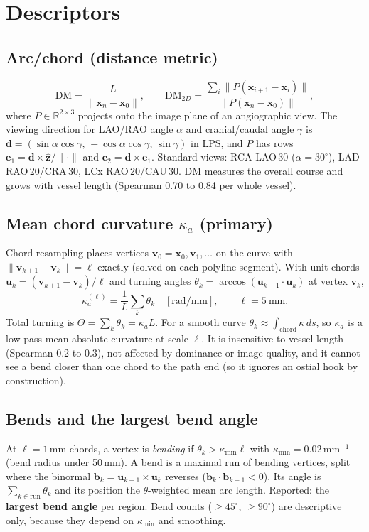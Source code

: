 \documentclass[11pt,a4paper]{article}
\newcommand{\ka}{\kappa_a}
\begin{document}
\section{Descriptors}

\subsection{Arc/chord (distance metric)}
\[
  \mathrm{DM} = \frac{L}{\lVert \mathbf{x}_n - \mathbf{x}_0 \rVert}, \qquad
  \mathrm{DM}_{2D} = \frac{\sum_i \lVert P(\mathbf{x}_{i+1}-\mathbf{x}_i)\rVert}{\lVert P(\mathbf{x}_n-\mathbf{x}_0)\rVert},
\]
where $P\in\mathbb{R}^{2\times3}$ projects onto the image plane of an angiographic view. The viewing
direction for LAO/RAO angle $\alpha$ and cranial/caudal angle $\gamma$ is
$\mathbf{d} = (\sin\alpha\cos\gamma,\,-\cos\alpha\cos\gamma,\,\sin\gamma)$ in LPS, and $P$ has rows
$\mathbf{e}_1 = \mathbf{d}\times\hat{\mathbf{z}}/\lVert\cdot\rVert$ and $\mathbf{e}_2=\mathbf{d}\times\mathbf{e}_1$.
Standard views: RCA LAO\,30 ($\alpha=30^\circ$), LAD RAO\,20/CRA\,30, LCx RAO\,20/CAU\,30.
DM measures the overall course and grows with vessel length (Spearman 0.70 to 0.84 per whole vessel).

\subsection{Mean chord curvature $\ka$ (primary)}
Chord resampling places vertices $\mathbf{v}_0=\mathbf{x}_0,\mathbf{v}_1,\dots$ on the curve with
$\lVert\mathbf{v}_{k+1}-\mathbf{v}_k\rVert=\ell$ exactly (solved on each polyline segment). With unit
chords $\mathbf{u}_k = (\mathbf{v}_{k+1}-\mathbf{v}_k)/\ell$ and turning angles
$\theta_k = \arccos(\mathbf{u}_{k-1}\cdot\mathbf{u}_k)$ at vertex $\mathbf{v}_k$,
\[
  \ka^{(\ell)} = \frac{1}{L}\sum_k \theta_k \quad [\text{rad/mm}], \qquad \ell = 5\ \text{mm}.
\]
Total turning is $\Theta = \sum_k\theta_k = \ka L$. For a smooth curve $\theta_k \approx \int_{\text{chord}}\kappa\,ds$,
so $\ka$ is a low-pass mean absolute curvature at scale $\ell$. It is insensitive to vessel length (Spearman
0.2 to 0.3), not affected by dominance or image quality, and it cannot see a bend closer than one chord to
the path end (so it ignores an ostial hook by construction).

\subsection{Bends and the largest bend angle}
At $\ell=1$\,mm chords, a vertex is \emph{bending} if $\theta_k > \kappa_{\min}\ell$ with
$\kappa_{\min}=0.02$\,mm$^{-1}$ (bend radius under 50\,mm). A bend is a maximal run of bending vertices,
split where the binormal $\mathbf{b}_k=\mathbf{u}_{k-1}\times\mathbf{u}_k$ reverses
($\mathbf{b}_k\cdot\mathbf{b}_{k-1}<0$). Its angle is $\sum_{k\in\text{run}}\theta_k$ and its position the
$\theta$-weighted mean arc length. Reported: the \textbf{largest bend angle} per region. Bend counts
($\ge45^\circ$, $\ge90^\circ$) are descriptive only, because they depend on $\kappa_{\min}$ and smoothing.
\end{document}
